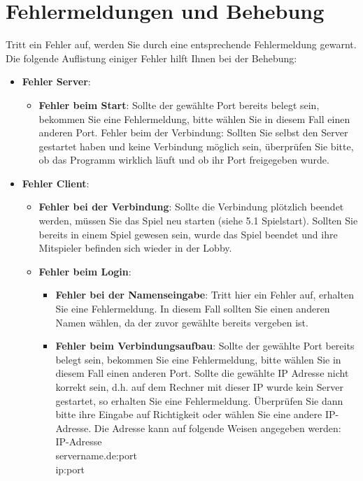 \documentclass[titlepage,10pt,a4paper]{article}
\begin{document}
\section{Fehlermeldungen und Behebung}
Tritt ein Fehler auf, werden Sie durch eine entsprechende Fehlermeldung gewarnt.
Die folgende Auflistung einiger Fehler hilft Ihnen bei der Behebung:
\begin{itemize}
\item \textbf{Fehler Server}:
	\begin{itemize}
	\item \textbf{Fehler beim Start}:
		Sollte der gewählte Port bereits belegt sein, bekommen Sie eine Fehlermeldung, bitte wählen Sie in diesem Fall einen anderen Port.
		{Fehler beim der Verbindung}:
		Sollten Sie selbst den Server gestartet haben und keine Verbindung möglich sein, überprüfen Sie bitte, ob das Programm wirklich läuft und ob ihr Port freigegeben wurde.
	\end{itemize}
\item \textbf{Fehler Client}:
	\begin{itemize}
	\item \textbf{Fehler bei der Verbindung}:
		Sollte die Verbindung plötzlich beendet werden, müssen Sie das Spiel neu starten (siehe 5.1 Spielstart). Sollten Sie bereits in einem Spiel gewesen sein, wurde das Spiel beendet und ihre Mitspieler befinden sich wieder in der Lobby.
	\item \textbf{Fehler beim Login}:
		\begin{itemize}
		\item \textbf{Fehler bei der Namenseingabe}:
			Tritt hier ein Fehler auf, erhalten Sie eine Fehlermeldung. In diesem Fall sollten Sie einen anderen Namen wählen, da der zuvor gewählte bereits vergeben ist.
		\item \textbf{Fehler beim Verbindungsaufbau}:
			Sollte der gewählte Port bereits belegt sein, bekommen Sie eine Fehlermeldung, bitte wählen Sie in diesem Fall einen anderen Port.
Sollte die gewählte IP Adresse nicht korrekt sein, d.h. auf dem Rechner mit dieser IP wurde kein Server gestartet, so erhalten Sie eine Fehlermeldung. Überprüfen Sie dann bitte ihre Eingabe auf Richtigkeit oder wählen Sie eine andere IP-Adresse.
Die Adresse kann auf folgende Weisen angegeben werden: \\
IP-Adresse\\
servername.de:port\\
ip:port\\
		\end{itemize}
	\end{itemize}
\end{itemize}
\end{document}
